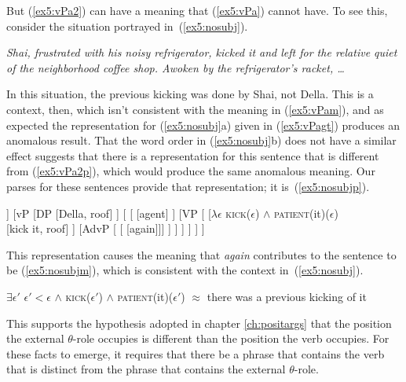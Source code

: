 But (\ref{ex5:vPa2}) can have a meaning that (\ref{ex5:vPa}) cannot have. To see this, consider the situation portrayed in~(\ref{ex5:nosubj}).
\begin{exe}
	\raggedright
	\sn \emph{Shai, frustrated with his noisy refrigerator, kicked it and left for the relative quiet of the neighborhood coffee shop. Awoken by the refrigerator's racket, \ldots}
	\ex \label{ex5:nosubj} 
	\begin{xlist}
	\end{xlist}
\end{exe}
In this situation, the previous kicking was done by Shai, not Della. This is a context, then, which isn't consistent with the meaning in (\ref{ex5:vPam}), and as expected the representation for (\ref{ex5:nosubj}a) given in (\ref{ex5:vPagt}) produces an anomalous result. That the word order in (\ref{ex5:nosubj}b) does not have a similar effect suggests that there is a representation for this sentence that is different from (\ref{ex5:vPa2p}), which would produce the same anomalous meaning. Our parses for these sentences provide that representation; it is~(\ref{ex5:nosubjp}).
\begin{exe}
	\raggedright
	\ex \label{ex5:nosubjp}
	\small
	\begin{forest}
	[\ibar{T}
		[\obar{T} [past] ]
		[vP
			[DP [Della, roof] ]
			[
				[ [agent] ]
				[VP [
					[$\lambda \epsilon$ \textsc{kick}($\epsilon$) $\wedge$ \textsc{patient}(it)($\epsilon$)\\ [kick it, roof] ]
					[AdvP [ [ [again]]] ]
				] ]
			 ]
		 ]
	]
	\end{forest}
\end{exe}
This representation causes the meaning that \emph{again} contributes to the sentence to be (\ref{ex5:nosubjm}), which is consistent with the context in~(\ref{ex5:nosubj}).
\begin{exe}
	\raggedright
	\ex \label{ex5:nosubjm} 
	$\exists \epsilon '$ $\epsilon ' < \epsilon$ $\wedge$ \textsc{kick}($\epsilon '$) $\wedge$ \textsc{patient}(it)($\epsilon '$)
	\sn $\approx$ there was a previous kicking of it
\end{exe}
This supports the hypothesis adopted in chapter \ref{ch:positargs} that the position the external $\theta$-role occupies is different than the position the verb occupies. For these facts to emerge, it requires that there be a phrase that contains the verb that is distinct from the phrase that contains the external $\theta$-role.

